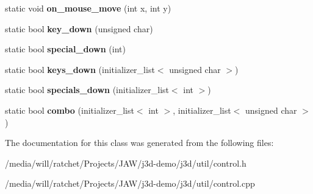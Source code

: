 \begin{DoxyCompactItemize}
\item 
\hypertarget{classj3d_1_1util_1_1control_ad1a7189d7e34a7d7d67063c992cad869}{}static void {\bfseries on\+\_\+mouse\+\_\+move} (int x, int y)\label{classj3d_1_1util_1_1control_ad1a7189d7e34a7d7d67063c992cad869}

\item 
\hypertarget{classj3d_1_1util_1_1control_a70ba20b8a559d004df3529ec5ac43da0}{}static bool {\bfseries key\+\_\+down} (unsigned char)\label{classj3d_1_1util_1_1control_a70ba20b8a559d004df3529ec5ac43da0}

\item 
\hypertarget{classj3d_1_1util_1_1control_a0051a4cf79d4f6f2f5fe4b552e6e927c}{}static bool {\bfseries special\+\_\+down} (int)\label{classj3d_1_1util_1_1control_a0051a4cf79d4f6f2f5fe4b552e6e927c}

\item 
\hypertarget{classj3d_1_1util_1_1control_a60de829699621b24dda45975e4d5575b}{}static bool {\bfseries keys\+\_\+down} (initializer\+\_\+list$<$ unsigned char $>$)\label{classj3d_1_1util_1_1control_a60de829699621b24dda45975e4d5575b}

\item 
\hypertarget{classj3d_1_1util_1_1control_a4b8e14fc1291d40fba2442e451236edd}{}static bool {\bfseries specials\+\_\+down} (initializer\+\_\+list$<$ int $>$)\label{classj3d_1_1util_1_1control_a4b8e14fc1291d40fba2442e451236edd}

\item 
\hypertarget{classj3d_1_1util_1_1control_a8519387af6a71de4d5e04290eaad2a4f}{}static bool {\bfseries combo} (initializer\+\_\+list$<$ int $>$, initializer\+\_\+list$<$ unsigned char $>$)\label{classj3d_1_1util_1_1control_a8519387af6a71de4d5e04290eaad2a4f}

\end{DoxyCompactItemize}


The documentation for this class was generated from the following files\+:\begin{DoxyCompactItemize}
\item 
/media/will/ratchet/\+Projects/\+J\+A\+W/j3d-\/demo/j3d/util/control.\+h\item 
/media/will/ratchet/\+Projects/\+J\+A\+W/j3d-\/demo/j3d/util/control.\+cpp\end{DoxyCompactItemize}
